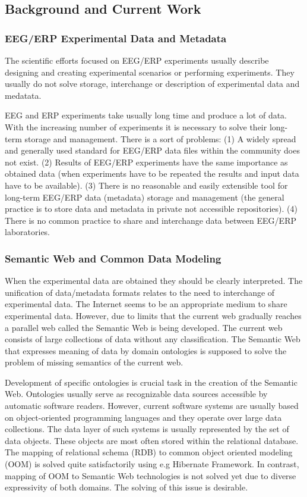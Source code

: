 \documentclass[a4paper, 10pt]{article}
\begin{document}
\subsection*{Background and Current Work}

\subsubsection*{EEG/ERP Experimental Data and Metadata}

The scientific efforts focused on EEG/ERP experiments usually describe designing and creating experimental scenarios or performing experiments. They usually do not solve storage, interchange or description of experimental data and medatata.

EEG and ERP experiments take usually long time and produce a lot of data. With the increasing number of experiments it is necessary to solve their long-term storage and management. There is a sort of problems: (1) A widely spread and generally used standard for EEG/ERP data files within the community does not exist. (2) Results of EEG/ERP experiments have the same importance as obtained data (when experiments have to be repeated the results and input data have to be available). (3) There is no reasonable and easily extensible tool for long-term EEG/ERP data (metadata) storage and management (the general practice is to store data and metadata in private not accessible repositories). (4) There is no common practice to share and interchange data between EEG/ERP laboratories.



\subsubsection*{Semantic Web and Common Data Modeling}

When the experimental data are obtained they should be clearly interpreted. The unification of data/metadata formats relates to the need to interchange of experimental data. The Internet seems to be an appropriate medium to share experimental data. However, due to limits that the current web gradually reaches a parallel web called the Semantic Web is being developed. The current web consists of large collections of data without any classification. The Semantic Web that expresses meaning of data by domain ontologies is supposed to solve the problem of missing semantics of the current web.

Development of specific ontologies is crucial task in the creation of the Semantic Web. Ontologies usually serve as recognizable data sources accessible by automatic software readers. However, current software systems are usually based on object-oriented programming languages and they operate over large data collections.  The data layer of such systems is usually represented by the set of data objects. These objects are most often stored within the relational database. The mapping of relational schema (RDB) to common object oriented modeling (OOM) is solved quite satisfactorily using e.g Hibernate Framework. In contrast, mapping of OOM to Semantic Web technologies is not solved yet due to diverse expressivity of both domains. The solving of this issue is desirable. 
\end{document}
